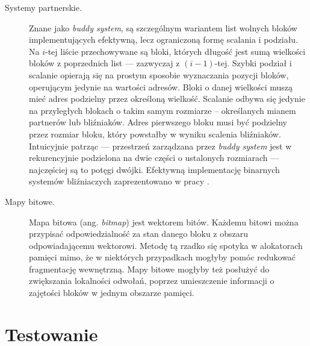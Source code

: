 \documentclass[12pt,a4paper,titlepage,twoside]{mwart}
\begin{document}
\begin{description}

\item[Systemy partnerskie.] Znane jako \textit{buddy system}, są szczególnym
wariantem list wolnych bloków implementujących efektywną, lecz ograniczoną
formę scalania i podziału. Na $i$-tej liście przechowywane są bloki, których
długość jest sumą wielkości bloków z poprzednich list --- zazwyczaj z
$(i-1)$-tej. Szybki podział i scalanie opierają się na prostym sposobie
wyznaczania pozycji bloków, operującym jedynie na wartości adresów.  Bloki o
danej wielkości muszą mieć adres podzielny przez określoną wielkość.  Scalanie
odbywa się jedynie na przyległych blokach o takim samym rozmiarze --
określanych mianem partnerów lub bliźniaków. Adres pierwszego bloku musi być
podzielny przez rozmiar bloku, który powstałby w wyniku scalenia bliźniaków.
Intuicyjnie patrząc --- przestrzeń zarządzana przez \textit{buddy system} jest w
rekurencyjnie podzielona na dwie części o ustalonych rozmiarach --- najczęściej
są to potęgi dwójki. Efektywną implementację binarnych systemów bliźniaczych
zaprezentowano w pracy \cite{demaine99fast}.

\vspace{1ex}

\item[Mapy bitowe.] Mapa bitowa (ang. \textit{bitmap}) jest wektorem bitów.
Każdemu bitowi można przypisać odpowiedzialność za stan danego bloku z obszaru
odpowiadającemu wektorowi. Metodę tą rzadko się spotyka w alokatorach pamięci
mimo, że w niektórych przypadkach mogłyby pomóc redukować fragmentację
wewnętrzną. Mapy bitowe mogłyby też posłużyć do zwiększania lokalności
odwołań, poprzez umieszczenie informacji o zajętości bloków w jednym
obszarze pamięci.

\end{description}

\newpage


\section{Testowanie}
\hypertarget{Testowanie}{}
\end{document}
